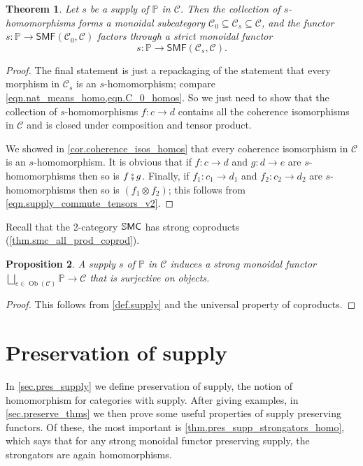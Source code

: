 \documentclass[11pt, oneside, article]{memoir}
\theoremstyle{plain}
\newtheorem{theorem}{Theorem}[chapter]
\newtheorem{proposition}[theorem]{Proposition}
\theoremstyle{definition}
\theoremstyle{remark}
\newcommand{\Set}[1]{\mathrm{#1}}%
\newcommand{\cat}[1]{\mathcal{#1}}%
\newcommand{\Cat}[1]{{\mathsf{#1}}}%
\newcommand{\CCat}[1]{\mathbb{\StrLeft{#1}{1}}\Cat{\StrGobbleLeft{#1}{1}}}%
\DeclareMathOperator{\ob}{\Set{Ob}}
\newcommand{\smf}{\Cat{SMF}}
\newcommand{\ssmc}{\CCat{SMC}}
\newcommand{\pp}{\mathbb{P}}
\newcommand{\mob}[1]{#1_0}
\newcommand{\cp}{\mathbin{\fatsemi}}
\renewcommand{\ss}{\subseteq}
\begin{document}
\begin{theorem}\label{thm.homos_form_subcat}
Let $s$ be a supply of $\pp$ in $\cat{C}$. Then the collection of $s$-homomorphisms forms a monoidal subcategory $\mob{\cat{C}}\ss\cat{C}_s\ss\cat{C}$, and the functor $s\colon\pp\to\smf(\mob{\cat{C}},\cat{C})$ factors through a strict monoidal functor
\[s\colon\pp\to\smf(\cat{C}_s,\cat{C}).\]
\end{theorem}
\begin{proof}
The final statement is just a repackaging of the statement that every morphism in $\cat{C}_s$ is an $s$-homomorphism; compare \cref{eqn.nat_means_homo,eqn.C_0_homos}. So we just need to show that the collection of $s$-homomorphisms $f\colon c\to d$ contains all the coherence isomorphisms in $\cat{C}$ and is closed under composition and tensor product. 

We showed in \cref{cor.coherence_isos_homos} that every coherence isomorphism in $\cat{C}$ is an $s$-homomorphism. It is obvious that if $f\colon c\to d$ and $g\colon d\to e$ are $s$-homomorphisms then so is $f\cp g$. Finally, if $f_1\colon c_1\to d_1$ and $f_2\colon c_2\to d_2$ are $s$-homomorphisms then so is $(f_1\otimes f_2)$; this follows from \cref{eqn.supply_commute_tensors_v2}.
\end{proof}

Recall that the 2-category $\ssmc$ has strong coproducts (\cref{thm.smc_all_prod_coprod}).
\begin{proposition}
A supply $s$ of $\pp$ in $\cat{C}$ induces a strong monoidal functor $\bigsqcup_{c\in\ob(\cat{C})}\pp\to\cat{C}$ that is surjective on objects.
\end{proposition}
\begin{proof}
This follows from \cref{def.supply} and the universal property of coproducts.
\end{proof}

\chapter{Preservation of supply}

In \cref{sec.pres_supply} we define preservation of supply, the notion of homomorphism for categories with supply. After giving examples, in \cref{sec.preserve_thms} we then prove some useful properties of supply preserving functors. Of these, the most important is \cref{thm.pres_supp_strongators_homo}, which says that for any strong monoidal functor preserving supply, the strongators are again homomorphisms.
\end{document}
